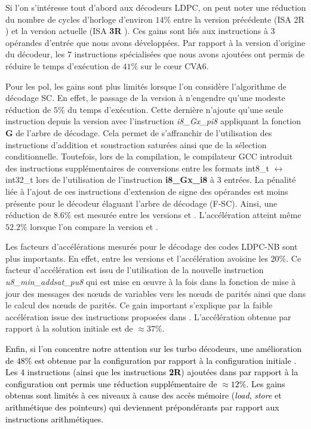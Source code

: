 \documentclass[../main.tex]{subfiles}
\begin{document}
Si l'on s'intéresse tout d'abord aux décodeurs LDPC, on peut noter une réduction du nombre de cycles d'horloge d'environ  $14\%$ entre la version précédente (ISA 2R ) et la version actuelle (ISA \textbf{3R} ). 
Ces gains sont liés aux instructions à $3$ opérandes d'entrée que nous avons développées.
Par rapport à la version d'origine du décodeur, les $7$ instructions spécialisées que nous avons ajoutées ont permis de réduire le temps d'exécution de $41\%$ sur le cœur CVA6.


Pour les \acrlong{pol}, les gains sont plus limités lorsque l'on considère l'algorithme de décodage SC. 
En effet, le passage de la version  à  n'engendre qu'une modeste réduction de $5\%$ du temps d'exécution. 
Cette dernière n'ajoute qu'une seule instruction depuis la version  avec l'instruction \textit{i8\_Gx\_pi8} appliquant la fonction \textbf{G} de l'arbre de décodage.
Cela permet de s'affranchir de l'utilisation des instructions d'addition et soustraction saturées ainsi que de la sélection conditionnelle. 
Toutefois, lors de la compilation, le compilateur GCC introduit des instructions supplémentaires de conversions entre les formats int8\_t $\leftrightarrow$ int32\_t lors de l'utilisation de l'instruction \textbf{i8\_Gx\_i8} à 3 entrées.
La pénalité liée à l'ajout de ces instructions d'extension de signe des opérandes est moins présente pour le décodeur élaguant l'arbre de décodage (F-SC).
Ainsi, une réduction de $8.6\%$ est mesurée entre les versions  et .
L'accélération atteint même $52.2\%$ lorsque l'on compare la version  et .


Les facteurs d'accélérations mesurés pour le décodage des codes LDPC-NB sont plus importants.
En effet, entre les versions  et  l'accélération avoisine les $20\%$.
Ce facteur d'accélération est issu de l'utilisation de la nouvelle instruction \textit{u8\_min\_addsat\_pu8} qui est mise en œuvre à la fois dans la fonction de mise à jour des messages des nœuds de variables vers les nœuds de parités ainsi que dans le calcul des nœuds de parités.
Ce gain important s'explique par la faible accélération issue des instructions proposées dans .
L'accélération obtenue par rapport à la solution initiale  est de $\approx 37\%$.

\textcolor{black}{Enfin, si l'on concentre notre attention sur les turbo décodeurs, une amélioration de $48\%$ est obtenue par la configuration  par rapport à la configuration initiale . 
Les $4$ instructions (ainsi que les instructions \textbf{2R}) ajoutées dans  par rapport à la configuration  ont permis une réduction supplémentaire de $\approx 12\%$.
Les gains obtenus sont limités à ces niveaux à cause des accès mémoire (\textit{load}, \textit{store} et arithmétique des pointeurs) qui deviennent prépondérants par rapport aux instructions arithmétiques.}
\end{document}
